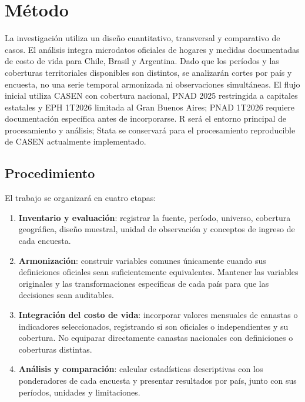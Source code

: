 \section{Método}

La investigación utiliza un diseño cuantitativo, transversal y comparativo de casos. El análisis integra microdatos oficiales de hogares y medidas documentadas de costo de vida para Chile, Brasil y Argentina. Dado que los períodos y las coberturas territoriales disponibles son distintos, se analizarán cortes por país y encuesta, no una serie temporal armonizada ni observaciones simultáneas. El flujo inicial utiliza CASEN con cobertura nacional, PNAD 2025 restringida a capitales estatales y EPH 1T2026 limitada al Gran Buenos Aires; PNAD 1T2026 requiere documentación específica antes de incorporarse. R será el entorno principal de procesamiento y análisis; Stata se conservará para el procesamiento reproducible de CASEN actualmente implementado.

\subsection{Procedimiento}
El trabajo se organizará en cuatro etapas:
\begin{enumerate}
    \item \textbf{Inventario y evaluación}: registrar la fuente, período, universo, cobertura geográfica, diseño muestral, unidad de observación y conceptos de ingreso de cada encuesta.
    \item \textbf{Armonización}: construir variables comunes únicamente cuando sus definiciones oficiales sean suficientemente equivalentes. Mantener las variables originales y las transformaciones específicas de cada país para que las decisiones sean auditables.
    \item \textbf{Integración del costo de vida}: incorporar valores mensuales de canastas o indicadores seleccionados, registrando si son oficiales o independientes y su cobertura. No equiparar directamente canastas nacionales con definiciones o coberturas distintas.
    \item \textbf{Análisis y comparación}: calcular estadísticas descriptivas con los ponderadores de cada encuesta y presentar resultados por país, junto con sus períodos, unidades y limitaciones.
\end{enumerate}

